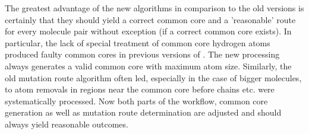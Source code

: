 The greatest advantage of the new algorithms in comparison to the old versions is certainly that they should yield a correct common core and a 'reasonable' route for every molecule pair without exception (if a correct common core exists). In particular, the lack of special treatment of common core hydrogen atoms produced faulty common cores in previous versions of {\trafo}. The new processing always generates a valid common core with maximum atom size. Similarly, the old mutation route algorithm often led, especially in the case of bigger molecules, to atom removals in regions near the common core before chains etc. were systematically processed. Now both parts of the workflow, common core generation as well as mutation route determination are adjusted and should always yield reasonable outcomes.
